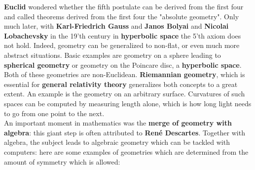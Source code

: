 \documentclass[12pt]{amsart}
\newcounter{example}    \def\example#1{ \item \fontsize{12}{15} \selectfont #1 \fontsize{12}{15} \selectfont }
\begin{document}
\begin{center}
 \end{center}

{\bf Euclid} wondered whether the fifth postulate can be derived from the first four and
called theorems derived from the first four the "absolute geometry". 
Only much later, with {\bf  Karl-Friedrich Gauss} and {\bf Janos Bolyai} and {\bf Nicolai Lobachevsky} in the 19'th century 
in {\bf hyperbolic space} the 5'th axiom does not hold. Indeed, geometry can be generalized to non-flat, or even much more abstract situations.
Basic examples are geometry on a sphere leading to {\bf spherical geometry} or geometry on the Poincare disc, a {\bf hyperbolic space}. 
Both of these geometries are non-Euclidean. {\bf Riemannian geometry}, which is essential for {\bf general relativity theory} generalizes
both concepts to a great extent. An example is the geometry on an arbitrary surface. Curvatures of such spaces can be computed by measuring
length alone, which is how long light needs to go from one point to the next. \\

An important moment in mathematics was the {\bf merge of geometry with algebra}: 
this giant step is often attributed to {\bf Ren\'e Descartes}. 
Together with algebra, the subject leads to algebraic geometry which can
be tackled with computers: here are some examples of geometries which are determined from the
amount of symmetry which is allowed: 

\begin{center}
 \end{center}
\end{document}
